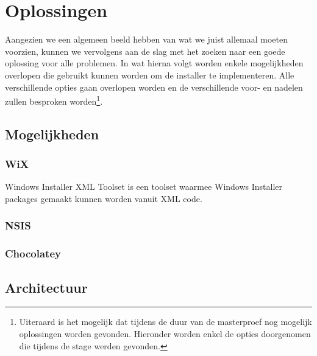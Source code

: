 \documentclass{article}
\begin{document}
\section{Oplossingen}
Aangezien we een algemeen beeld hebben van wat we juist allemaal moeten voorzien, kunnen we vervolgens aan de slag met het zoeken naar een goede oplossing voor alle problemen.
In wat hierna volgt worden enkele mogelijkheden overlopen die gebruikt kunnen worden om de installer te implementeren.
Alle verschillende opties gaan overlopen worden en de verschillende voor- en nadelen zullen besproken worden\footnote{Uiteraard is het mogelijk dat tijdens de duur van de masterproef nog mogelijk oplossingen worden gevonden.
Hieronder worden enkel de opties doorgenomen die tijdens de stage werden gevonden.}.

\subsection{Mogelijkheden}
\subsubsection{WiX}\citep{wixMain}
Windows Installer XML Toolset is een toolset waarmee Windows Installer packages gemaakt kunnen worden vanuit XML code. 
\subsubsection{NSIS}\citep{nsisFeatures}

\subsubsection{Chocolatey}
\subsection{Architectuur}



\end{document}
